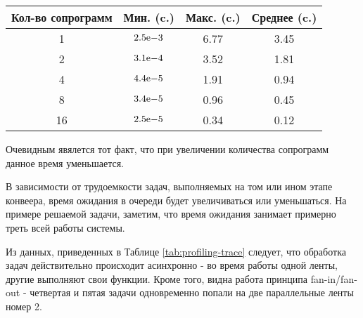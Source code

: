 \begin{table}[!ht]
	\begin{center}
		\begin{tabular}{|c|c|c|c|} 
			\hline
			Кол-во сопрограмм & Мин. (c.) & Макс. (c.) & Среднее (c.)  \\  
			\hline
			1 & ${2.5}\mathrm{e}{-3}$ & 6.77 & 3.45 \\
			\hline
			2 & ${3.1}\mathrm{e}{-4}$ & 3.52 & 1.81 \\
			\hline
			4 & ${4.4}\mathrm{e}{-5}$ & 1.91 & 0.94 \\
			\hline
			8 & ${3.4}\mathrm{e}{-5}$ & 0.96 & 0.45 \\
			\hline
			16 & ${2.5}\mathrm{e}{-5}$ & 0.34 & 0.12 \\
			\hline
		\end{tabular}
		\label{tab:profiling-all}
	\end{center}
\end{table}

Очевидным явялется тот факт, что при увеличении количества сопрограмм данное время уменьшается.

В зависимости от трудоемкости задач, выполняемых на том или ином этапе конвеера, время ожидания в очереди будет
увеличиваться или уменьшаться. На примере решаемой задачи, заметим, что время ожидания занимает примерно треть всей работы
системы.


Из данных, приведенных в Таблице \ref{tab:profiling-trace} следует, что обработка задач действительно происходит асинхронно -
 во время работы одной ленты, другие выполняют свои функции. Кроме того, видна работа принципа fan-in/fan-out - четвертая и 
 пятая задачи одновременно попали на две параллельные ленты номер 2.


